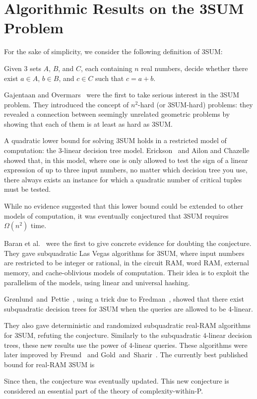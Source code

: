 \section{Algorithmic Results on the 3SUM Problem}
For the sake of simplicity, we consider the following definition of 3SUM\@:
\begin{problem}[3SUM]
Given 3 sets $A$, $B$, and $C$, each containing $n$ real numbers, decide
whether there exist $a \in A$, $b \in B$, and $c \in C$ such that $c=a+b$.
\end{problem}

Gajentaan and Overmars~\cite{GO95} were the first to take serious interest in
the 3SUM problem. They introduced the concept of \(n^2\)-hard (or
3SUM-hard) problems:
they revealed a connection between seemingly unrelated geometric
problems by showing that each of them is at least as hard as 3SUM.

A quadratic lower bound for solving 3SUM holds in a restricted model of
computation: the $3$-linear decision tree model. Erickson~\cite{Er99a}
and Ailon and Chazelle~\cite{AC05} showed
that, in this model, where one is only allowed to test the sign of a linear
expression of up to three input numbers, no matter which decision tree you
use, there always exists an instance for which a quadratic number of
critical tuples must be tested.


While no evidence suggested that this lower bound could be extended to other
models of computation, it was eventually conjectured that 3SUM requires
$\Omega(n^2)$ time.

Baran et al.~\cite{BDP08} were the first to give concrete evidence
for doubting the conjecture.
They gave subquadratic Las Vegas algorithms for 3SUM, where input
numbers are restricted to be integer or rational, in the circuit RAM,
word RAM, external memory, and cache-oblivious models of computation. Their idea
is to exploit the parallelism of the models, using linear and
universal hashing.

Gr\o nlund~and~Pettie~\cite{GP18}, using a trick due to Fredman~\cite{Fr76},
showed that there exist subquadratic decision trees for 3SUM when the queries
are allowed to be $4$-linear.

They also gave deterministic and randomized
subquadratic real-RAM algorithms for 3SUM, refuting the conjecture.
Similarly to the subquadratic $4$-linear decision trees, these new results
use the power of $4$-linear queries.
%
These algorithms were later improved by Freund~\cite{Fr15} and
Gold~and~Sharir~\cite{GS15}.
The currently best published bound for real-RAM 3SUM is

Since then, the conjecture was eventually updated. This new conjecture is
considered an essential part of the theory of complexity-within-P.


